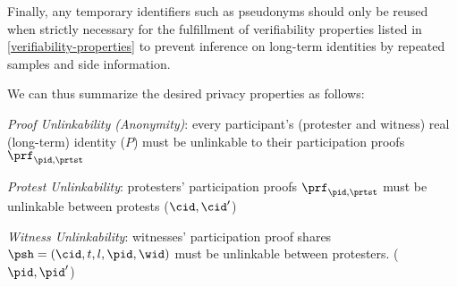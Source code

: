 

Finally, any temporary identifiers such as pseudonyms should only be reused 
when strictly necessary for the fulfillment of verifiability properties listed 
in \cref{verifiability-properties} to prevent inference on long-term identities 
by repeated samples and side information.

We can thus summarize the desired privacy properties as follows:
\begin{requirements}[P]
\item\label{ProofUnlink} \emph{Proof Unlinkability (Anonymity)}: every 
  participant's (protester and witness) real (long-term) identity (\(P\)) must 
  be unlinkable to their participation proofs \(\prf_{\pid, \prtst}\)
\item\label{ProtestUnlink} \emph{Protest Unlinkability}: protesters' participation proofs \(\prf_{\pid, \prtst}\) must be unlinkable between protests (\(\cid, \cid' \))
\item\label{WitnessUnlink}\emph{Witness Unlinkability}:  witnesses' participation proof shares \(\psh = (\cid, t, l, \pid,\wid)\) must be unlinkable between protesters. (\(\pid, \pid' \))
\end{requirements}


